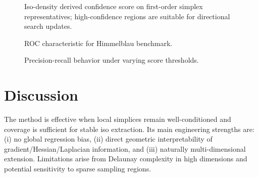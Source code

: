 ﻿\documentclass[conference]{IEEEtran}
\begin{document}
\begin{figure}[t]
\centering
{}
\caption{Iso-density derived confidence score on first-order simplex representatives; high-confidence regions are suitable for directional search updates.}
\end{figure}

\begin{figure}[t]
\centering
{}
\caption{ROC characteristic for Himmelblau benchmark.}
\end{figure}

\begin{figure}[t]
\centering
{}
\caption{Precision-recall behavior under varying score thresholds.}
\end{figure}

\section{Discussion}
The method is effective when local simplices remain well-conditioned and coverage is sufficient for stable iso extraction. Its main engineering strengths are: (i) no global regression bias, (ii) direct geometric interpretability of gradient/Hessian/Laplacian information, and (iii) naturally multi-dimensional extension. Limitations arise from Delaunay complexity in high dimensions and potential sensitivity to sparse sampling regions.
\end{document}

